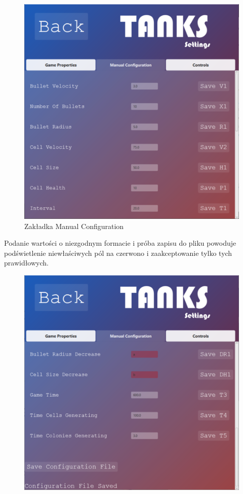 \documentclass[11pt,a4paper]{report}
\begin{document}
\begin{itemize}
\begin{figure}[!ht]
\centerline{\includegraphics{img/zakladka2.png}}
\caption{Zakładka Manual Configuration }
\end{figure}
\newpage
Podanie wartości o niezgodnym formacie i próba zapisu do pliku powoduje podświetlenie niewłaściwych pól na czerwono i zaakceptowanie tylko tych prawidłowych.
\begin{figure}[!ht]
\centerline{\includegraphics{img/zakladka2.1.png}}

\end{figure}
\end{itemize}
\end{document}
